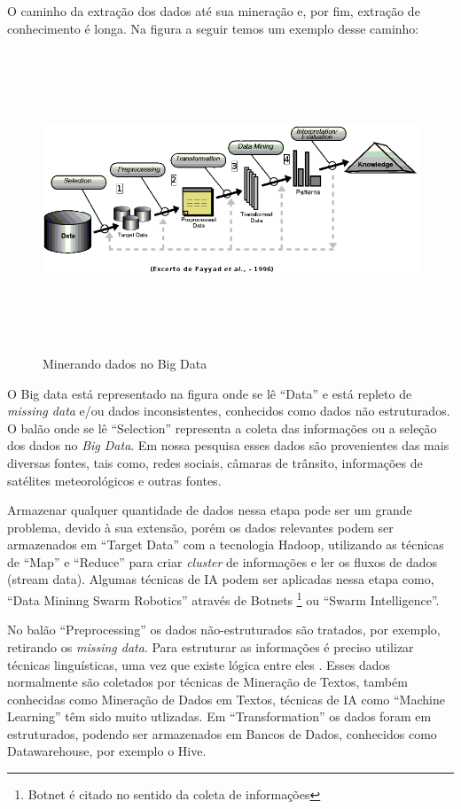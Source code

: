 O caminho da extração dos dados até sua mineração e, por fim, extração de conhecimento é longa.
Na figura a seguir temos um exemplo desse caminho:

\begin{figure}[!ht]
\centering
\caption{Minerando dados no Big Data}
\includegraphics[width=140mm, height=90mm]{Figuras/BigData/FayyadSemFundo.png}
\end{figure}


O Big data está representado na figura onde se lê ``Data'' e está repleto de \textit{missing data} e/ou dados inconsistentes, conhecidos como dados não estruturados. 
O balão onde se lê ``Selection'' representa a coleta das informações ou a seleção dos dados no \textit{Big Data}.
Em nossa pesquisa esses dados são provenientes das mais diversas fontes, tais como, redes sociais, câmaras de trânsito, informações de satélites meteorológicos e outras fontes.

Armazenar qualquer quantidade de dados nessa etapa pode ser um grande problema, devido à sua extensão, porém os dados relevantes podem ser armazenados em ``Target Data'' 
com a tecnologia Hadoop, utilizando as técnicas de ``Map'' e ``Reduce'' para criar \textit{cluster} de informações e ler os fluxos de dados (stream data). Algumas técnicas de 
IA podem ser aplicadas nessa etapa como, ``Data Mininng Swarm Robotics'' através de Botnets \footnote{Botnet é citado no sentido da coleta de informações} ou ``Swarm Intelligence''. 

No balão ``Preprocessing'' os dados não-estruturados são tratados, por exemplo, retirando os \textit{missing data}. 
Para estruturar as informações é preciso utilizar técnicas linguísticas, uma vez que existe lógica entre eles \cite{Aranha2006}.
Esses dados normalmente são coletados por técnicas de Mineração de Textos, também conhecidas como Mineração de Dados em Textos, técnicas de IA como ``Machine Learning'' 
têm sido muito utlizadas. Em ``Transformation'' os dados foram em estruturados, podendo ser armazenados em Bancos de Dados, conhecidos como Datawarehouse, por exemplo o Hive. 

